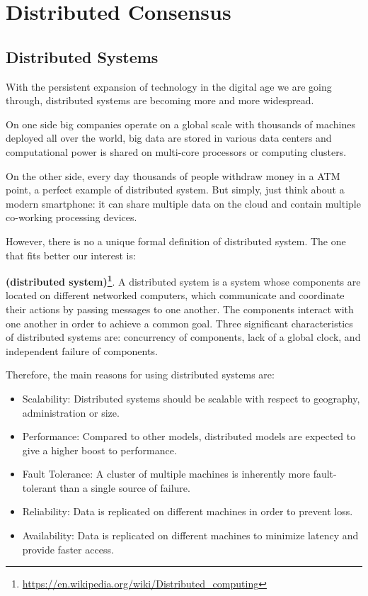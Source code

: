 \chapter{Distributed Consensus}
\label{chpr:consensus}

\bigskip
\section{Distributed Systems}
\label{sec:distributed-systems}
With the persistent expansion of technology in the digital age we are going through, distributed systems are becoming more and more widespread.

\bigskip
\noindent
On one side big companies operate on a global scale with thousands of machines deployed all over the world, big data are stored in various data centers and computational power is shared on multi-core processors or computing clusters.

\bigskip
\noindent
On the other side, every day thousands of people withdraw money in a ATM point, a perfect example of distributed system. But simply, just think about a modern smartphone: it can share multiple data on the cloud and contain multiple co-working processing devices.

\bigskip
\noindent
However, there is no a unique formal definition of distributed system. The one that fits better our interest is:
\begin{mydef} {\bf (distributed system)\footnote{\url{https://en.wikipedia.org/wiki/Distributed_computing}}}.
    A distributed system is a system whose components are located on different networked computers, which communicate and coordinate their actions by passing messages to one another. The components interact with one another in order to achieve a common goal. Three significant characteristics of distributed systems are: concurrency of components, lack of a global clock, and independent failure of components.
\end{mydef}

\bigskip
\noindent
Therefore, the main reasons for using distributed systems are:
\begin{itemize}
    \item Scalability: Distributed systems should be scalable with respect to geography, administration or size.
    \item Performance: Compared to other models, distributed models are expected to give a higher boost to performance.
    \item Fault Tolerance: A cluster of multiple machines is inherently more fault-tolerant than a single source of failure.
    \item Reliability: Data is replicated on different machines in order to prevent loss.
    \item Availability: Data is replicated on different machines to minimize latency and provide faster access.
\end{itemize}

